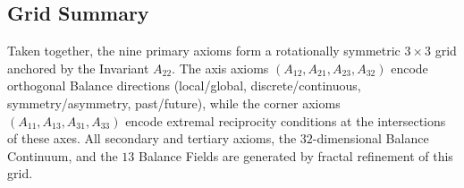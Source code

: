 \subsection{Grid Summary}

Taken together, the nine primary axioms form a rotationally symmetric $3 \times 3$ grid anchored by the Invariant $A_{22}$.
The axis axioms $(A_{12},A_{21},A_{23},A_{32})$ encode orthogonal Balance directions (local/global, discrete/continuous, symmetry/asymmetry, past/future), while the corner axioms $(A_{11},A_{13},A_{31},A_{33})$ encode extremal reciprocity conditions at the intersections of these axes.
All secondary and tertiary axioms, the $32$-dimensional Balance Continuum, and the $13$ Balance Fields are generated by fractal refinement of this grid.\cite{AurphyxThesis,AurphyxSymbiotic,AurphyxFractalQC}
